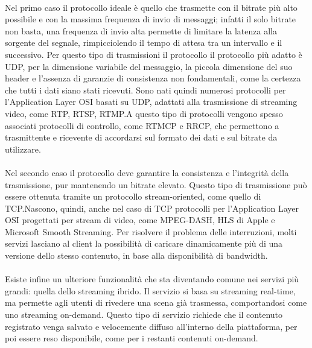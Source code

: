 			\paragraph*{}
			Nel primo caso il protocollo ideale è quello che trasmette con il bitrate più alto possibile e con la massima frequenza di invio di messaggi; infatti il solo bitrate non basta, una frequenza di invio alta permette di limitare la latenza alla sorgente del segnale, rimpicciolendo il tempo di attesa tra un intervallo e il successivo. Per questo tipo di trasmissioni il protocollo il protocollo più adatto è \gls{UDP}, per la dimensione variabile del messaggio, la piccola dimensione del suo header e l'assenza di garanzie di consistenza non fondamentali, come la certezza che tutti i dati siano stati ricevuti. Sono nati quindi numerosi protocolli per l'Application Layer \gls{OSI} basati su \gls{UDP}, adattati alla trasmissione di streaming video, come \gls{RTP}, \gls{RTSP}, \gls{RTMP}.\@ A questo tipo di protocolli vengono spesso associati protocolli di controllo, come \gls{RTMCP} e \gls{RRCP}, che permettono a trasmittente e ricevente di accordarsi sul formato dei dati e sul bitrate da utilizzare.
			\paragraph*{}
			Nel secondo caso il protocollo deve garantire la consistenza e l'integrità della trasmissione, pur mantenendo un bitrate elevato. Questo tipo di trasmissione può essere ottenuta tramite un protocollo stream-oriented, come quello di \gls{TCP}.\@ Nascono, quindi, anche nel caso di TCP protocolli per l'Application Layer \gls{OSI} progettati per stream di video, come \gls{MPEG-DASH}, \gls{HLS} di Apple e Microsoft Smooth Streaming. Per risolvere il problema delle interruzioni, molti servizi lasciano al client la possibilità di caricare dinamicamente più di una versione dello stesso contenuto, in base alla disponibilità di bandwidth.
			\paragraph*{}
			Esiste infine un ulteriore funzionalità che sta diventando comune nei servizi più grandi: quella dello streaming ibrido. Il servizio si basa su streaming real-time, ma permette agli utenti di rivedere una scena già trasmessa, comportandosi come uno streaming on-demand. Questo tipo di servizio richiede che il contenuto registrato venga salvato e velocemente diffuso all'interno della piattaforma, per poi essere reso disponibile, come per i restanti contenuti on-demand.

